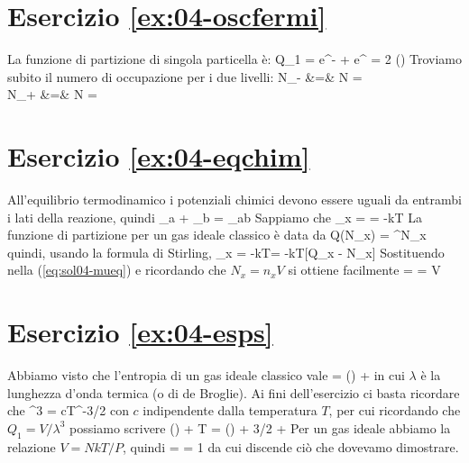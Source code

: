 \section*{Esercizio \ref{ex:04-oscfermi}}
La funzione di partizione di singola particella è:
\be
Q_1 = e^{-\beta\varepsilon} + e^{\beta\varepsilon} = 2 \cosh(\beta\varepsilon)
\ee
Troviamo subito il numero di occupazione per i due livelli:
\bea
N_{-} &=& N 
=  \nonumber \\
N_{+} &=& N 
= 
\eea

\section*{Esercizio \ref{ex:04-eqchim}}

All'equilibrio termodinamico i potenziali chimici devono essere uguali da entrambi i lati della reazione, quindi
\be
	\label{eq:sol04-mueq}
	\mu_a + \mu_b = \mu_{ab}
\ee
	Sappiamo che 
\be
	\mu_x = = -kT
\ee
	La funzione di partizione per un gas ideale classico è data da
\be
	Q(N_x) = \left[Q_x\right]^{N_x}
\ee
	quindi, usando la formula di Stirling, 
\be
	\mu_x = -kT\left[ N_x\ln Q_x - N_x\ln N_x + N_x \right] = -kT[\ln Q_x - \ln N_x]
\ee
	Sostituendo nella (\ref{eq:sol04-mueq}) e ricordando che $N_x = n_x V$ si ottiene facilmente
\be 
	= \ln {} \quad\rightarrow\quad 
	 = V
\ee

\section*{Esercizio \ref{ex:04-esps}}
Abbiamo visto  che l'entropia di un gas ideale classico vale
\be
{} = \ln\left(\right) + 
\ee
in cui $\lambda$ è la lunghezza d'onda termica (o di de Broglie). Ai fini dell'esercizio ci basta ricordare che
\be
\lambda^3 = cT^{-3/2}
\ee
con $c$ indipendente dalla temperatura $T$,  per cui ricordando che $Q_1 = V/\lambda^3$ possiamo scrivere
\be
\ln\left(\right) + T =
\ln\left(\right) + 3/2 + 
\ee
Per un gas ideale abbiamo la relazione $V = NkT/P$, quindi
\be
{} =  = 1
\ee
da cui discende ciò che dovevamo dimostrare.
